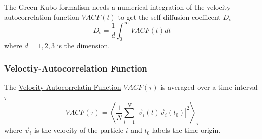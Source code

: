 \documentclass[
  letterpaper,
]{article}
\begin{document}

The Green-Kubo formalism needs a numerical integration of the
velocity-autocorrelation function \(VACF(t)\) to get the self-diffusion
coefficent \(D_{\mathrm{s}}\) \[
D_{\mathrm{s}} = \frac{1}{d} \int _{0}^{\infty} VACF(t)  dt
\] where \(d=1,2,3\) is the dimension.

\hypertarget{veloctiy-autocorrelation-function}{%
\subsubsection{Veloctiy-Autocorrelation
Function}\label{veloctiy-autocorrelation-function}}

The \href{}{Velocity-Autocorrelatin Function} \(VACF(\tau)\) is averaged
over a time interval \(\tau\) \[
VACF(\tau) = \left < \frac{1}{N} \sum_{i=1}^{N} |\vec{v} _{i}(t) \vec{v} _{i}(t_0)|^2 \right >_{\tau}
\] where \(\vec{v}_{i}\) is the velocity of the particle \(i\) and
\(t_0\) labels the time origin.
\end{document}
